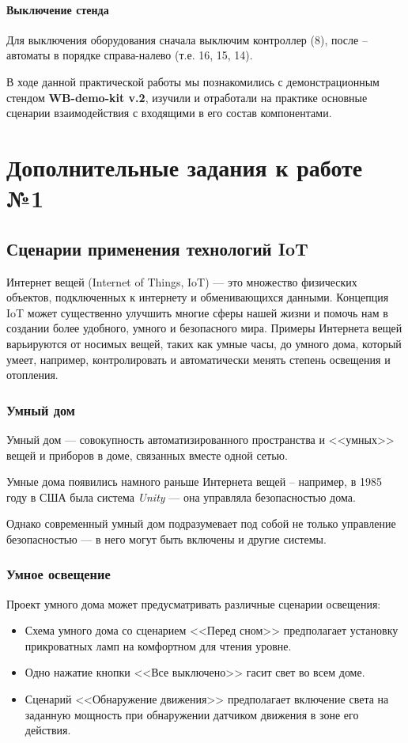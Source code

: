 \documentclass[a4paper,14pt]{extarticle}
\begin{document}
\paragraph*{Выключение стенда}
	Для выключения оборудования сначала выключим контроллер (8), после -- автоматы в
	порядке справа-налево (т.е. 16, 15, 14).
	
В ходе данной практической работы мы познакомились с демонстрационным стендом\textbf{ WB-demo-kit v.2}, изучили и отработали на практике основные сценарии взаимодействия с входящими в его состав компонентами.

\newpage

\section{Дополнительные задания к работе №1}
\subsection{Сценарии применения технологий IoT}
Интернет вещей (Internet of Things, IoT) --- это множество физических объектов, подключенных к интернету и обменивающихся данными. Концепция IoT может существенно улучшить многие сферы нашей жизни и помочь нам в создании более удобного, умного и безопасного мира. Примеры Интернета вещей варьируются от носимых вещей, таких как умные часы, до умного дома, который умеет, например, контролировать и автоматически менять степень освещения и отопления. 
\subsubsection*{Умный дом}

Умный дом --- совокупность автоматизированного пространства и <<умных>> вещей и приборов в доме, связанных вместе одной сетью.

Умные дома появились намного раньше Интернета вещей -- например, в 1985 году в США была система \textit{Unity} — она управляла безопасностью дома.

Однако современный умный дом подразумевает под собой не только управление безопасностью — в него могут быть включены и другие системы.
\subsubsection*{Умное освещение}
Проект умного дома может предусматривать различные сценарии освещения:
\begin{itemize}
	\item Схема умного дома со сценарием <<Перед сном>> предполагает установку прикроватных ламп на комфортном для чтения уровне.
	\item Одно нажатие кнопки <<Все выключено>> гасит свет во всем доме.
	\item Сценарий <<Обнаружение движения>> предполагает включение света на заданную мощность при обнаружении датчиком движения в зоне его действия.
\end{itemize}
\end{document}
